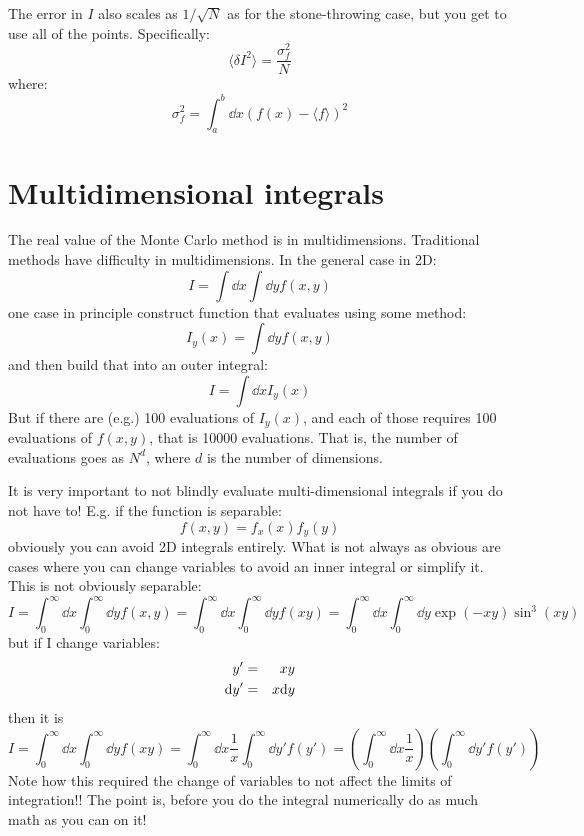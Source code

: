 The error in $I$ also scales as $1/\sqrt{N}$ as for the stone-throwing
case, but you get to use all of the points.  Specifically:
\begin{equation}
\langle \delta I^2 \rangle = \frac{\sigma_f^2}{N} 
\end{equation}
where:
\begin{equation}
\sigma_f^2 = \int_a^b \dd{x} (f(x) - \langle f\rangle)^2
\end{equation}

\section{Multidimensional integrals}

The real value of the Monte Carlo method is in
multidimensions. Traditional methods have difficulty in
multidimensions. In the general case in 2D:
\begin{equation}
I = \int \dd{x} \int \dd{y} f(x, y)
\end{equation}
one case in principle construct function that evaluates using some
method:
\begin{equation}
I_y(x) = \int \dd{y} f(x, y)
\end{equation}
and then build that into an outer integral:
\begin{equation}
I = \int \dd{x} I_y(x)
\end{equation}
But if there are (e.g.) 100 evaluations of $I_y(x)$, and each of those
requires 100 evaluations of $f(x,y)$, that is 10000 evaluations. That
is, the number of evaluations goes as $N^d$, where $d$ is the number
of dimensions. 

It is very important to not blindly evaluate multi-dimensional
integrals if you do not have to! E.g. if the function is separable:
\begin{equation}
f(x, y) = f_x(x) f_y(y)
\end{equation}
obviously you can avoid 2D integrals entirely. What is not always as
obvious are cases where you can change variables to avoid an inner
integral or simplify it. This is not obviously separable:
\begin{equation}
  I = \int_0^\infty \dd{x} \int_0^\infty \dd{y} f(x, y) =
  \int_0^\infty \dd{x} \int_0^\infty \dd{y} f(xy) =
  \int_0^\infty \dd{x} \int_0^\infty \dd{y} \exp(- xy) \sin^3(xy)
\end{equation}
but if I change variables:
\begin{eqnarray}
y' &=& xy \cr
{\rm d}y' &=& x{\rm d}y
\end{eqnarray}
then it is
\begin{equation}
  I = \int_0^\infty \dd{x} \int_0^\infty \dd{y} f(xy) =
  \int_0^\infty \dd{x} \frac{1}{x} \int_0^\infty \dd{y'} f(y') =
  \left(\int_0^\infty \dd{x} \frac{1}{x}\right)
  \left(\int_0^\infty \dd{y'} f(y') \right)
\end{equation}
Note how this required the change of variables to not affect the
limits of integration!! The point is, before you do the integral
numerically do as much math as you can on it!

